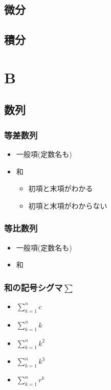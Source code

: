 \documentclass[10pt,dvipdfmx]{jsarticle}
\begin{document}
\subsection*{微分}
\subsection*{積分}


\newpage
\section*{B}
\subsection*{数列}
\subsubsection*{等差数列}
\begin{itemize}
  \item 一般項(定数名も)
  \item 和
        \begin{itemize}
          \item 初項と末項がわかる
          \item 初項と末項がわからない
        \end{itemize}
\end{itemize}
\subsubsection*{等比数列}
\begin{itemize}
  \item 一般項(定数名も)
  \item 和
\end{itemize}

\subsubsection*{和の記号シグマ$\sum$}
\begin{LARGE}
  \begin{itemize}
    \item $\sum_{k=1}^{n}c$
    \item $\sum_{k=1}^{n}k$
    \item $\sum_{k=1}^{n}k^2$
    \item $\sum_{k=1}^{n}k^3$
    \item $\sum_{k=1}^{n}r^k$
  \end{itemize}
\end{LARGE}
\end{document}
